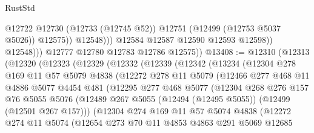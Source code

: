 \begin{lexlean}{RustStd}
\begin{coremodule}
{\begin{coremodule}
{{{{{{{{{{{{{{{{{{{{{{{{{{{{{{{{{{{{{{{{{{{{{{{{{{{{{{{{{{{{{{{{{{{{{{{{{{{{{{{{                            @12722
                            @12730
                            (@12733 (@12745 @52))
                            @12751
                            (@12499 (@12753 @5037 @5026))
                            @12575))
                        @12548)))
                  @12584
                  @12587
                  @12590
                  @12593
                  @12598))
              @12548)))
        @12777
        @12780
        @12783
        @12786
        @12575))
@13408 := @12310
    (@12313
      (@12320
        (@12323
          (@12329
            (@12332
              (@12339
                (@12342
                  (@13234
                    (@12304
                      @278
                      @169
                      @11
                      @57
                      @5079
                      @4838
                      (@12272
                        @278
                        @11
                        @5079
                        (@12466
                          @277
                          @468
                          @11
                          @4886
                          @5077
                          @4454
                          @481
                          (@12295
                            @277
                            @468
                            @5077
                            (@12304
                              @268
                              @276
                              @157
                              @76
                              @5055
                              @5076
                              (@12489
                                @267
                                @5055
                                (@12494 (@12495 @5055))
                                (@12499 (@12501 @267 @157)))
                              (@12304
                                @274
                                @169
                                @11
                                @57
                                @5074
                                @4838
                                (@12272
                                  @274
                                  @11
                                  @5074
                                  (@12654
                                    @273
                                    @70
                                    @11
                                    @4853
                                    @4863
                                    @291
                                    @5069
                                    @12685
}}}}}}}}}}}}}}}}}}}}}}}}}}}}}}}}}}}}}}}}}}}}}}}}}}}}}}}}}}}}}}}}}}}}}}}}}}}}}}}}
\end{coremodule}}
\end{coremodule}
\end{lexlean}
